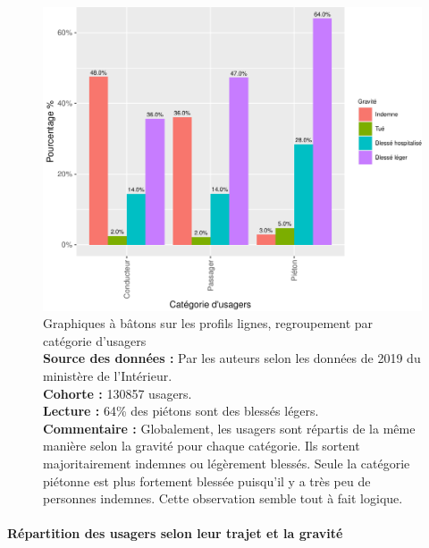 \documentclass[french,]{tp}
\let\oldparagraph\paragraph
\renewcommand{\paragraph}[1]{\oldparagraph{#1}\mbox{}}
\begin{document}
\begin{figure}[ht!]

{\centering \includegraphics{Prediction_Gravite_files/figure-latex/barplotcatu-1} 

}

\caption{Graphiques à bâtons sur les profils lignes, regroupement par catégorie d'usagers\\
\textbf{Source des données :} Par les auteurs selon les données de 2019 du ministère de l'Intérieur.\\
\textbf{Cohorte :} 130857 usagers.\\
\textbf{Lecture :} 64\% des piétons sont des blessés légers.\\
\textbf{Commentaire :} Globalement, les usagers sont répartis de la même manière selon la gravité pour chaque catégorie. Ils sortent majoritairement indemnes ou légèrement blessés. Seule la catégorie piétonne est plus fortement blessée puisqu'il y a très peu de personnes indemnes. Cette observation semble tout à fait logique.}\label{fig:barplotcatu}
\end{figure}

\newpage

\hypertarget{ruxe9partition-des-usagers-selon-leur-trajet-et-la-gravituxe9}{%
\paragraph{Répartition des usagers selon leur trajet et la gravité}\label{ruxe9partition-des-usagers-selon-leur-trajet-et-la-gravituxe9}}
\end{document}

